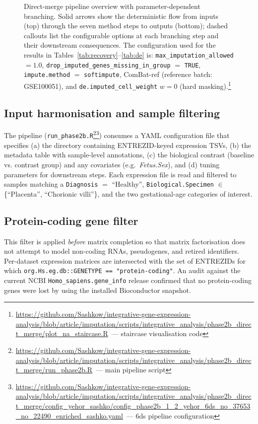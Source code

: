 \documentclass[11pt,a4paper]{article}
\newcommand{\ghb}{https://github.com/Sashkow/integrative-gene-expression-analysis/blob/article/imputation}
\newcommand{\src}[2]{\footnote{\url{\ghb/#1}~--- #2}}
\begin{document}
\begin{figure}[htbp]
\begin{tikzpicture}
\end{tikzpicture}
\caption{Direct-merge pipeline overview with parameter-dependent
  branching. Solid arrows show the deterministic flow from
  inputs (top) through the seven method steps to outputs
  (bottom); dashed callouts list the configurable options at
  each branching step and their downstream consequences. The
  configuration used for the results in
  Tables~\ref{tab:recovery}--\ref{tab:de} is:
  \texttt{max\_imputation\_allowed} $=1.0$,
  \texttt{drop\_imputed\_genes\_missing\_in\_group} $=$
  \texttt{TRUE},
  \texttt{impute.method} $=$ \texttt{softimpute},
  ComBat-ref (reference batch: GSE100051), and
  \texttt{de.imputed\_cell\_weight} $w = 0$ (hard masking).\src{scripts/integrative_analysis/phase2b_direct_merge/plot_na_staircase.R}{staircase visualisation code}}
\label{fig:pipeline}
\end{figure}

\subsection{Input harmonisation and sample filtering}

The pipeline
(\texttt{run\_phase2b.R}\src{scripts/integrative_analysis/phase2b_direct_merge/run_phase2b.R}{main pipeline script}\src{scripts/integrative_analysis/phase2b_direct_merge/config_yehor_sashko/config_phase2b_1_2_yehor_6ds_no_37653_no_22490_enriched_sashko.yaml}{6ds pipeline configuration})
consumes a YAML
configuration file that specifies (a) the directory containing
ENTREZID-keyed expression TSVs, (b) the metadata table with
sample-level annotations, (c) the biological contrast (baseline vs.
contrast group) and any covariates (e.g.~\textit{Fetus.Sex}),
and (d) tuning parameters for downstream steps. Each expression
file is read and filtered to samples matching a \texttt{Diagnosis}
$=$ ``Healthy'', \texttt{Biological.Specimen} $\in$
\{``Placenta'', ``Chorionic villi''\}, and the two
gestational-age categories of interest.

\subsection{Protein-coding gene filter}

This filter is applied \emph{before} matrix
completion so that matrix factorisation does not attempt to
model non-coding RNAs, pseudogenes, and retired identifiers.
Per-dataset expression matrices are intersected with the set of
ENTREZIDs for which
\texttt{org.Hs.eg.db::GENETYPE == "protein-coding"}.
An audit against the current NCBI \texttt{Homo\_sapiens.gene\_info}
release confirmed that no protein-coding genes were lost by
using the installed Bioconductor snapshot.
\end{document}
